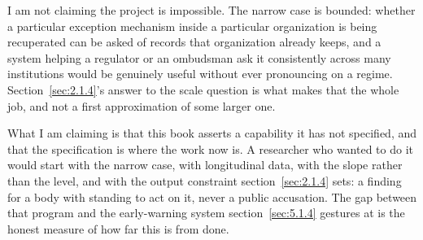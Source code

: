 I am not claiming the project is impossible. The narrow case is bounded: whether a particular exception mechanism inside a particular organization is being recuperated can be asked of records that organization already keeps, and a system helping a regulator or an ombudsman ask it consistently across many institutions would be genuinely useful without ever pronouncing on a regime. Section~\ref{sec:2.1.4}'s answer to the scale question is what makes that the whole job, and not a first approximation of some larger one.

What I am claiming is that this book asserts a capability it has not specified, and that the specification is where the work now is. A researcher who wanted to do it would start with the narrow case, with longitudinal data, with the slope rather than the level, and with the output constraint section~\ref{sec:2.1.4} sets: a finding for a body with standing to act on it, never a public accusation. The gap between that program and the early-warning system section~\ref{sec:5.1.4} gestures at is the honest measure of how far this is from done.
